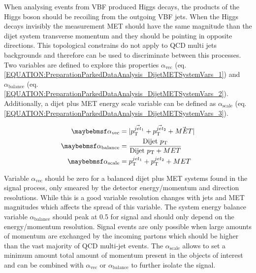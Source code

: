 
When analysing events from \gls{VBF} produced Higgs decays, the products of the Higgs boson should be recoiling from the outgoing \gls{VBF} jets. When the Higgs decays invisibly the measurement \gls{MET} should have the same magnitude than the dijet system transverse momentum and they should be pointing in opposite directions. This topological constrains do not apply to \gls{QCD} multi jets backgrounds and therefore can be used to discriminate between this processes. Two variables are defined to explore this properties $\alpha_{\text{vec}}$ (eq. \ref{EQUATION:PreparationParkedDataAnalysis_DijetMETSystemVars_1}) and $\alpha_{\text{balance}}$ (eq. \ref{EQUATION:PreparationParkedDataAnalysis_DijetMETSystemVars_2}). Additionally, a  dijet plus \gls{MET} energy scale variable can be defined as  $\alpha_{\text{scale}}$ (eq. \ref{EQUATION:PreparationParkedDataAnalysis_DijetMETSystemVars_3}).

\begin{align}
\alpha_{\text{vec}}     &= |\vec{\pt^{jet_1}} + \vec{\pt^{jet_2}} + \vec{MET}|
\label{EQUATION:PreparationParkedDataAnalysis_DijetMETSystemVars_1} \\
\alpha_{\text{balance}} &= \frac{\text{Dijet } \pt}{\text{Dijet } \pt + MET} 
\label{EQUATION:PreparationParkedDataAnalysis_DijetMETSystemVars_2} \\
\alpha_{\text{scale}}   &= \pt^{jet_1} + \pt^{jet_2} + MET 
\label{EQUATION:PreparationParkedDataAnalysis_DijetMETSystemVars_3} \\
\end{align}

Variable $\alpha_{\text{vec}}$ should be zero for a balanced dijet plus \gls{MET} systems found in the signal process, only smeared by the detector energy/momentum and direction resolutions. While this is a good variable resolution changes with jets and \gls{MET} magnitudes which affects the spread of this variable. The system energy balance variable $\alpha_{\text{balance}}$ should peak at 0.5 for signal and should only depend on the energy/momentum resolution. Signal events are only possible when large amounts of momentum are exchanged by the incoming partons which should be higher than the vast majority of \gls{QCD} multi-jet events. The $\alpha_{\text{scale}}$ allows to set a minimum amount total amount of momentum present in the objects of interest and can be combined with $\alpha_{\text{vec}}$ or $\alpha_{\text{balance}}$ to further isolate the signal.

